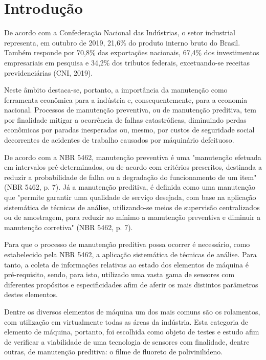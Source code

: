 \documentclass[
	12pt,				
	oneside,			
	a4paper,			
	english,			
	brazil				
	]{abntex2ppgsi}
\begin{document}

\chapter{Introdução}
De acordo com a Confederação Nacional das Indústrias, o setor industrial representa, em outubro de 2019, 21,6\% do produto interno bruto do Brasil. Também responde por 70,8\% das exportações nacionais, 67,4\% dos investimentos empresariais em pesquisa  e 34,2\% dos tributos federais, excetuando-se receitas previdenciárias (CNI, 2019). 

Neste âmbito destaca-se, portanto, a importância da manutenção como ferramenta econômica para a indústria e, consequentemente, para a economia nacional. Processos de manutenção preventiva, ou de manutenção preditiva, tem por finalidade mitigar a ocorrência de falhas catastróficas, diminuindo perdas econômicas por paradas inesperadas ou, mesmo, por custos de seguridade social decorrentes de acidentes de trabalho causados por máquinário defeituoso.

De acordo com a NBR 5462, manutenção preventiva é uma "manutenção efetuada em intervalos pré-determinados, ou de acordo com critérios prescritos, destinada a reduzir a probabilidade de falha ou a degradação do funcionamento de um item" (NBR 5462, p. 7). Já a manutenção preditiva, é definida como uma manutenção que "permite garantir uma qualidade de serviço desejada, com base na aplicação sistemática de técnicas de análise, utilizando-se meios de supervisão centralizados ou de amostragem, para reduzir ao mínimo a manutenção preventiva e diminuir a manutenção corretiva" (NBR 5462, p. 7). 

Para que o processo de manutenção preditiva possa ocorrer é necessário, como estabelecido pela NBR 5462, a aplicação sistemática de técnicas de análise. Para tanto, a coleta de informações relativas ao estado dos elementos de máquina é pré-requisito, sendo, para isto, utilizado uma vasta gama de sensores com diferentes propósitos e especificidades afim de aferir os mais distintos parâmetros destes elementos. 

Dentre os diversos elementos de máquina um dos mais comuns são os rolamentos, com utilização em virtualmente todas as áreas da indústria. Esta categoria de elemento de máquina, portanto, foi escolhida como objeto de testes e estudo afim de verificar a viabilidade de uma tecnologia  de sensores com finalidade, dentre outras, de manutenção preditiva: o filme de fluoreto de polivinilideno. 
\end{document}
